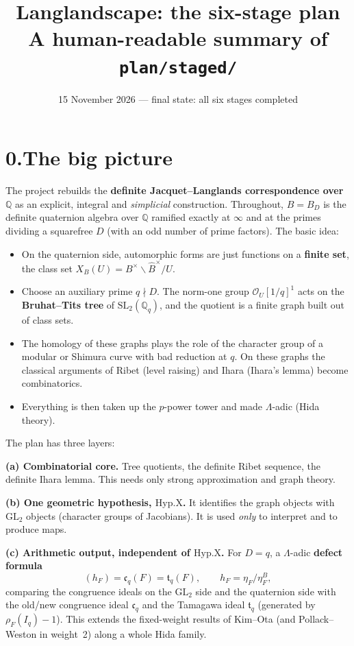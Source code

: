 \documentclass[11pt,a4paper]{article}
\title{\textbf{Langlandscape: the six-stage plan}\\[2pt]
\large A human-readable summary of \texttt{plan/staged/}}
\author{}
\date{15 November 2026 --- final state: all six stages completed}
\newcommand{\Q}{\mathbb{Q}}
\newcommand{\Qq}{\mathbb{Q}_q}
\newcommand{\cO}{\mathcal{O}}
\newcommand{\Bhat}{\widehat{B}}
\newcommand{\XB}[1]{X_B(#1)}
\newcommand{\GL}{\mathrm{GL}}
\newcommand{\SL}{\mathrm{SL}}
\newcommand{\cc}{\mathfrak{c}}
\newcommand{\tq}{\mathfrak{t}}
\newcommand{\HypX}{\mathrm{Hyp.X}}
\begin{document}
\maketitle
\vspace{-1.5em}

\section*{0.\quad The big picture}

The project rebuilds the \textbf{definite Jacquet--Langlands correspondence over $\Q$} as an explicit, integral
and \emph{simplicial} construction. Throughout, $B=B_D$ is the definite quaternion algebra over $\Q$ ramified exactly
at $\infty$ and at the primes dividing a squarefree $D$ (with an odd number of prime factors). The basic idea:
\begin{itemize}
  \item On the quaternion side, automorphic forms are just functions on a \textbf{finite set}, the class set
        $\XB{U}=B^\times\backslash\Bhat^\times/U$.
  \item Choose an auxiliary prime $q\nmid D$. The norm-one group $\cO_U[1/q]^1$ acts on the \textbf{Bruhat--Tits tree}
        of $\SL_2(\Qq)$, and the quotient is a finite graph built out of class sets.
  \item The homology of these graphs plays the role of the character group of a modular or Shimura curve with bad
        reduction at $q$. On these graphs the classical arguments of Ribet (level raising) and Ihara (Ihara's lemma)
        become combinatorics.
  \item Everything is then taken up the $p$-power tower and made $\Lambda$-adic (Hida theory).
\end{itemize}

The plan has three layers:
\begin{tcolorbox}[colback=gray!5,colframe=gray!50,boxrule=0.5pt,arc=1pt]
\textbf{(a) Combinatorial core.} Tree quotients, the definite Ribet sequence, the definite Ihara lemma. This needs only
strong approximation and graph theory.

\textbf{(b) One geometric hypothesis, $\HypX$.} It identifies the graph objects with $\GL_2$ objects (character groups
of Jacobians). It is used \emph{only} to interpret and to produce maps.

\textbf{(c) Arithmetic output, independent of $\HypX$.} For $D=q$, a $\Lambda$-adic \textbf{defect formula}
\[
  (h_F)=\cc_q(F)=\tq_q(F),\qquad h_F=\eta_F/\eta_F^B,
\]
comparing the congruence ideals on the $\GL_2$ side and the quaternion side with the old/new congruence ideal $\cc_q$
and the Tamagawa ideal $\tq_q$ (generated by $\rho_F(I_q)-1$). This extends the fixed-weight results of Kim--Ota (and
Pollack--Weston in weight~2) along a whole Hida family.
\end{tcolorbox}
\end{document}
